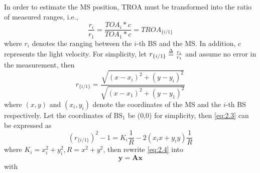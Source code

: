 \documentclass[journal]{IEEEtran}
\begin{document}
In order to estimate the MS position, TROA must be transformed into the ratio of measured ranges, i.e.,
\begin{equation}\label{eq:2.2}
 \frac{{{r}_{i}}}{{{r}_{1}}}=\frac{TO{{A}_{i}}*c}{TO{{A}_{1}}*c}=TRO{{A}_{\{i/1\}}}
\end{equation}
where ${{{r}_{i}}}$ denotes the ranging between the $i$-th BS and the MS. In addition, $c$ represents the light velocity. For simplicity, let ${r_{\{ i/1\} }} \buildrel \Delta \over = \frac{{{r_i}}}{{{r_1}}}$ and assume no error in the measurement, then
\begin{equation}\label{eq:2.3}
{r}_{\{i/1\}}=\frac{\sqrt{{{(x-{{x}_{i}})}^{2}}+{{(y-{{y}_{i}})}^{2}}}}{\sqrt{{{(x-{{x}_{1}})}^{2}}+{{(y-{{y}_{1}})}^{2}}}}
\end{equation}
where ${(x,y)}$ and ${({{x}_{i}},{{y}_{i}})}$ denote the coordinates of the MS and the $i$-th BS respectively. Let the coordinates of BS${_{1}}$ be (0,0) for simplicity, then \eqref{eq:2.3} can be expressed as
\begin{equation}\label{eq:2.4}
{{\left({r}_{\{i/1\}}\right)}^{2}}-1={{K}_{i}}\frac{1}{R}-2({{x}_{i}}x+{{y}_{i}}y)\frac{1}{R}
\end{equation}
where ${{{K}_{i}}=x_{i}^{2}+y_{i}^{2},R={{x}^{2}}+{{y}^{2}}}$, then rewrite \eqref{eq:2.4} into
\begin{equation}\label{eq:2.5}
\mathbf{y}\!=\!\mathbf{Ax}
\end{equation}
with
\end{document}

